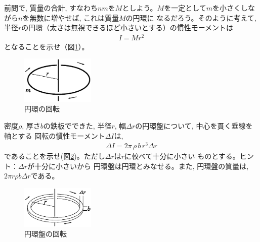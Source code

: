 %
\begin{q}\label{q:mominert_ring}
前問で, 質量の合計, すなわち$nm$を$M$としよう。$M$を一定として$m$を小さくしながら$n$を無数に増やせば, これは質量$M$の円環に
なるだろう。そのように考えて, 半径$r$の円環（太さは無視できるほど小さいとする）の慣性モーメントは
\begin{eqnarray}
I=Mr^2\label{eq:mominert_ring}
\end{eqnarray}
となることを示せ（図\ref{fig:disk3}）。
\begin{figure}[h]
    \centering
    \includegraphics[width=3.5cm]{disk3.eps}
    \caption{円環の回転}\label{fig:disk3}
\end{figure}
\end{q}

%
\begin{q}\label{q:mominert_ringplate}
密度$\rho$, 厚さ$b$の鉄板でできた, 半径$r$, 幅$\Delta r$の円環盤について, 中心を貫く垂線を軸とする
回転の慣性モーメント$\Delta I$は, 
\begin{eqnarray}
\Delta I=2\pi\,\rho\,b\,r^3 \Delta r\label{eq:mominert_ringplate}
\end{eqnarray}
であることを示せ(図\ref{fig:disk4})。ただし$\Delta r$は$r$に較べて十分に小さい
ものとする。ヒント：$\Delta r$が十分に小さいから
円環盤は円環とみなせる。また, 円環盤の質量は, $2\pi r \rho b\Delta r$である。
\begin{figure}[h]
    \centering
    \includegraphics[width=3.5cm]{disk4.eps}
    \caption{円環盤の回転}\label{fig:disk4}
\end{figure}
\end{q}

